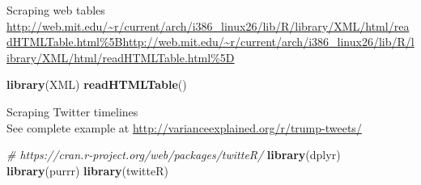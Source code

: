 \documentclass[10,portrait]{article}
\newenvironment{Shaded}{\begin{snugshade}}{\end{snugshade}}
\newcommand{\KeywordTok}[1]{\textcolor[rgb]{0.13,0.29,0.53}{\textbf{#1}}}
\newcommand{\CommentTok}[1]{\textcolor[rgb]{0.56,0.35,0.01}{\textit{#1}}}
\newcommand{\NormalTok}[1]{#1}
\begin{document}
Scraping web tables\\
\url{http://web.mit.edu/~r/current/arch/i386_linux26/lib/R/library/XML/html/readHTMLTable.html\%5Bhttp://web.mit.edu/~r/current/arch/i386_linux26/lib/R/library/XML/html/readHTMLTable.html\%5D}

\begin{Shaded}
\begin{Highlighting}[]
\KeywordTok{library}\NormalTok{(XML)}
\KeywordTok{readHTMLTable}\NormalTok{()}
\end{Highlighting}
\end{Shaded}

Scraping Twitter timelines\\
See complete example at
\url{http://varianceexplained.org/r/trump-tweets/}

\begin{Shaded}
\begin{Highlighting}[]
\CommentTok{# https://cran.r-project.org/web/packages/twitteR/}
\KeywordTok{library}\NormalTok{(dplyr)}
\KeywordTok{library}\NormalTok{(purrr)}
\KeywordTok{library}\NormalTok{(twitteR)}
\end{Highlighting}
\end{Shaded}

\printbibliography
\end{document}
